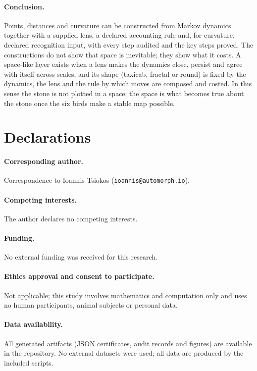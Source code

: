 \paragraph{Conclusion.}
Points, distances and curvature can be constructed from Markov dynamics together with a supplied lens, a declared accounting rule and, for curvature, declared recognition input, with every step audited and the key steps proved.
The constructions do not show that space is inevitable; they show what it costs.
A space-like layer exists when a lens makes the dynamics close, persist and agree with itself across scales, and its shape (taxicab, fractal or round) is fixed by the dynamics, the lens and the rule by which moves are composed and costed.
In this sense the stone is not plotted in a space; the space is what becomes true about the stone once the six birds make a stable map possible.

\section*{Declarations}

\paragraph{Corresponding author.}
Correspondence to Ioannis Tsiokos (\texttt{ioannis@automorph.io}).

\paragraph{Competing interests.}
The author declares no competing interests.

\paragraph{Funding.}
No external funding was received for this research.

\paragraph{Ethics approval and consent to participate.}
Not applicable; this study involves mathematics and computation only and uses no human participants, animal subjects or personal data.

\paragraph{Data availability.}
All generated artifacts (JSON certificates, audit records and figures) are available in the repository. No external datasets were used; all data are produced by the included scripts.

